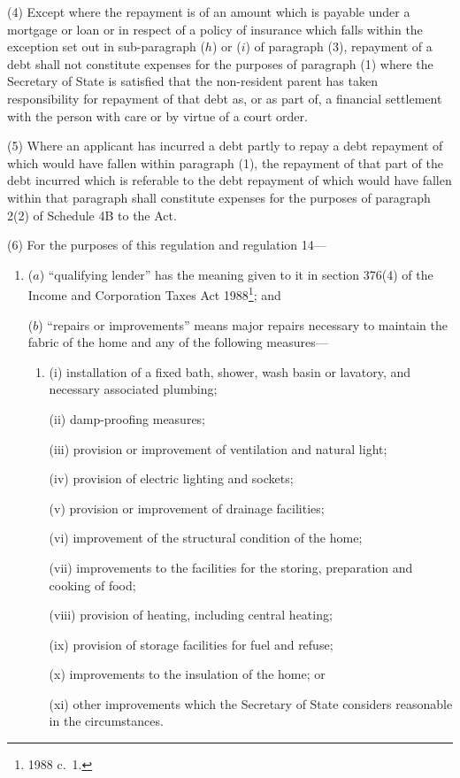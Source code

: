 \documentclass[12pt,a4paper]{article}
\begin{document}
(4) Except where the repayment is of an amount which is payable under a mortgage or loan or in respect of a policy of insurance which falls within the exception set out in sub-paragraph ($h$)  or ($i$)  of paragraph (3), repayment of a debt shall not constitute expenses for the purposes of paragraph (1) where the Secretary of State is satisfied that the non-resident parent has taken responsibility for repayment of that debt as, or as part of, a financial settlement with the person with care or by virtue of a court order.

(5) Where an applicant has incurred a debt partly to repay a debt repayment of which would have fallen within paragraph (1), the repayment of that part of the debt incurred which is referable to the debt repayment of which would have fallen within that paragraph shall constitute expenses for the purposes of paragraph 2(2) of Schedule 4B to the Act.

(6) For the purposes of this regulation and regulation 14—
\begin{enumerate}\item[]
($a$) “qualifying lender” has the meaning given to it in section 376(4) of the Income and Corporation Taxes Act 1988\footnote{1988 c.\ 1.}; and

($b$) “repairs or improvements” means major repairs necessary to maintain the fabric of the home and any of the following measures—
\begin{enumerate}\item[]
(i) installation of a fixed bath, shower, wash basin or lavatory, and necessary associated plumbing;

(ii) damp-proofing measures;

(iii) provision or improvement of ventilation and natural light;

(iv) provision of electric lighting and sockets;

(v) provision or improvement of drainage facilities;

(vi) improvement of the structural condition of the home;

(vii) improvements to the facilities for the storing, preparation and cooking of food;

(viii) provision of heating, including central heating;

(ix) provision of storage facilities for fuel and refuse;

(x) improvements to the insulation of the home; or

(xi) other improvements which the Secretary of State considers reasonable in the circumstances.
\end{enumerate}
\end{enumerate}
\end{document}
